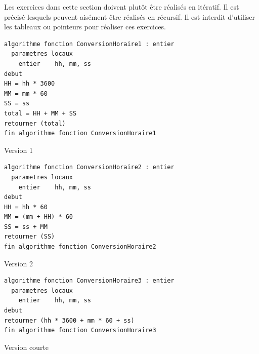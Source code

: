 \documentclass[11pt,a4paper]{article}
\begin{document}
\bigskip

Les exercices dans cette section doivent plutôt être réalisés en itératif.
Il est précisé lesquels peuvent aisément être réalisés en récursif.
Il est interdit d'utiliser les tableaux ou pointeurs pour réaliser ces exercices.

\bigskip


\begin{table}[ht!]
  \centering
\begin{lstlisting}[style=algorithmique]
algorithme fonction ConversionHoraire1 : entier
  parametres locaux
    entier    hh, mm, ss
debut
HH = hh * 3600
MM = mm * 60
SS = ss
total = HH + MM + SS
retourner (total)
fin algorithme fonction ConversionHoraire1 \end{lstlisting}
Version 1

\bigskip

\begin{lstlisting}[style=algorithmique]
algorithme fonction ConversionHoraire2 : entier
  parametres locaux
    entier    hh, mm, ss
debut
HH = hh * 60
MM = (mm + HH) * 60
SS = ss + MM
retourner (SS)
fin algorithme fonction ConversionHoraire2 \end{lstlisting}
Version 2

\bigskip

\begin{lstlisting}[style=algorithmique]
algorithme fonction ConversionHoraire3 : entier
  parametres locaux
    entier    hh, mm, ss
debut
retourner (hh * 3600 + mm * 60 + ss)
fin algorithme fonction ConversionHoraire3 \end{lstlisting}
Version courte
\end{table}



\clearpage

\end{document}

